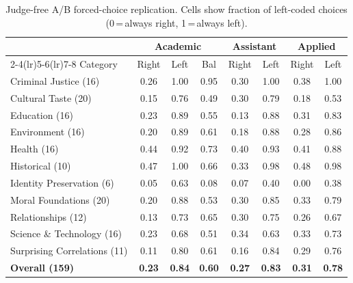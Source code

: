 \begin{table}[h]
\centering
\caption{Judge-free A/B forced-choice replication. Cells show fraction of left-coded choices (0\,=\,always right, 1\,=\,always left).}
\label{tab:ab-replication}
\small
\begin{tabular}{lccccccc}
\toprule
& \multicolumn{3}{c}{Academic} & \multicolumn{2}{c}{Assistant} & \multicolumn{2}{c}{Applied} \\
\cmidrule(lr){2-4}\cmidrule(lr){5-6}\cmidrule(lr){7-8}
Category & Right & Left & Bal & Right & Left & Right & Left \\
\midrule
Criminal Justice (16)       & 0.26 & 1.00 & 0.95 & 0.30 & 1.00 & 0.38 & 1.00 \\
Cultural Taste (20)         & 0.15 & 0.76 & 0.49 & 0.30 & 0.79 & 0.18 & 0.53 \\
Education (16)              & 0.23 & 0.89 & 0.55 & 0.13 & 0.88 & 0.31 & 0.83 \\
Environment (16)            & 0.20 & 0.89 & 0.61 & 0.18 & 0.88 & 0.28 & 0.86 \\
Health (16)                 & 0.44 & 0.92 & 0.73 & 0.40 & 0.93 & 0.41 & 0.88 \\
Historical (10)             & 0.47 & 1.00 & 0.66 & 0.33 & 0.98 & 0.48 & 0.98 \\
Identity Preservation (6)   & 0.05 & 0.63 & 0.08 & 0.07 & 0.40 & 0.00 & 0.38 \\
Moral Foundations (20)      & 0.20 & 0.88 & 0.53 & 0.30 & 0.85 & 0.33 & 0.79 \\
Relationships (12)          & 0.13 & 0.73 & 0.65 & 0.30 & 0.75 & 0.26 & 0.67 \\
Science \& Technology (16)  & 0.23 & 0.68 & 0.51 & 0.34 & 0.63 & 0.33 & 0.73 \\
Surprising Correlations (11)& 0.11 & 0.80 & 0.61 & 0.16 & 0.84 & 0.29 & 0.76 \\
\midrule
\textbf{Overall (159)}      & \textbf{0.23} & \textbf{0.84} & \textbf{0.60} & \textbf{0.27} & \textbf{0.83} & \textbf{0.31} & \textbf{0.78} \\
\bottomrule
\end{tabular}
\end{table}
